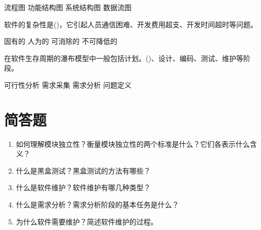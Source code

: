 \documentclass[answers]{exam}
\begin{document}
\begin{questions}
\begin{oneparchoices}
		\choice 流程图
		\choice 功能结构图
		\choice 系统结构图
		\correctchoice 数据流图
	\end{oneparchoices}
	\question 软件的复杂性是()，它引起人员通信困难、开发费用超支、开发时间超时等问题。\\
	\begin{oneparchoices}
		\correctchoice 固有的
		\choice 人为的
		\choice 可消除的
		\choice 不可降低的
	\end{oneparchoices}
	\question 在软件生存周期的瀑布模型中一般包括计划。()、设计、编码、测试、维护等阶段。\\
	\begin{oneparchoices}
		\choice 可行性分析
		\choice 需求采集
		\choice 需求分析
		\correctchoice 问题定义
	\end{oneparchoices}
\end{questions}
\section{简答题}
\begin{enumerate}
	\item 如何理解模块独立性？衡量模块独立性的两个标准是什么？它们各表示什么含义？
	\item 什么是黑盒测试？黑盒测试的方法有哪些？
	\item 什么是软件维护？软件维护有哪几种类型？
	\item 什么是需求分析？需求分析阶段的基本任务是什么？
	\item 为什么软件需要维护？简述软件维护的过程。
\end{enumerate}
\end{document}
